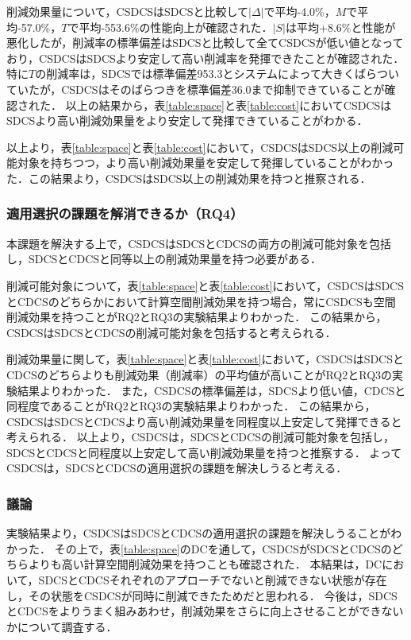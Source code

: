 削減効果量について，CSDCSはSDCSと比較して$|\Delta|$で平均-4.0\%，$M$で平均-57.0\%，$T$で平均-553.6\%の性能向上が確認された．$|S|$は平均+8.6\%と性能が悪化したが，削減率の標準偏差はSDCSと比較して全てCSDCSが低い値となっており，CSDCSはSDCSより安定して高い削減率を発揮できたことが確認された．特に$T$の削減率は，SDCSでは標準偏差953.3とシステムによって大きくばらついていたが，CSDCSはそのばらつきを標準偏差36.0まで抑制できていることが確認された．
以上の結果から，表\ref{table:space}と表\ref{table:cost}においてCSDCSはSDCSより高い削減効果量をより安定して発揮できていることがわかる．

以上より，表\ref{table:space}と表\ref{table:cost}において，CSDCSはSDCS以上の削減可能対象を持ちつつ，より高い削減効果量を安定して発揮していることがわかった．この結果より，CSDCSはSDCS以上の削減効果を持つと推察される．

\subsubsection{適用選択の課題を解消できるか（RQ4）}
本課題を解決する上で，CSDCSはSDCSとCDCSの両方の削減可能対象を包括し，SDCSとCDCSと同等以上の削減効果量を持つ必要がある．

削減可能対象について，表\ref{table:space}と表\ref{table:cost}において，CSDCSはSDCSとCDCSのどちらかにおいて計算空間削減効果を持つ場合，常にCSDCSも空間削減効果を持つことがRQ2とRQ3の実験結果よりわかった．
この結果から，CSDCSはSDCSとCDCSの削減可能対象を包括すると考えられる．

削減効果量に関して，表\ref{table:space}と表\ref{table:cost}において，CSDCSはSDCSとCDCSのどちらよりも削減効果（削減率）の平均値が高いことがRQ2とRQ3の実験結果よりわかった．
また，CSDCSの標準偏差は，SDCSより低い値，CDCSと同程度であることがRQ2とRQ3の実験結果よりわかった．
この結果から，CSDCSはSDCSとCDCSより高い削減効果量を同程度以上安定して発揮できると考えられる．
以上より，CSDCSは，SDCSとCDCSの削減可能対象を包括し，SDCSとCDCSと同程度以上安定して高い削減効果量を持つと推察する．
よってCSDCSは，SDCSとCDCSの適用選択の課題を解決しうると考える．


\subsubsection{議論}
実験結果より，CSDCSはSDCSとCDCSの適用選択の課題を解決しうることがわかった．
その上で，表\ref{table:space}のDCを通して，CSDCSがSDCSとCDCSのどちらよりも高い計算空間削減効果を持つことも確認された．
本結果は，DCにおいて，SDCSとCDCSそれぞれのアプローチでないと削減できない状態が存在し，その状態をCSDCSが同時に削減できたためだと思われる．
今後は，SDCSとCDCSをよりうまく組みあわせ，削減効果をさらに向上させることができないかについて調査する．

